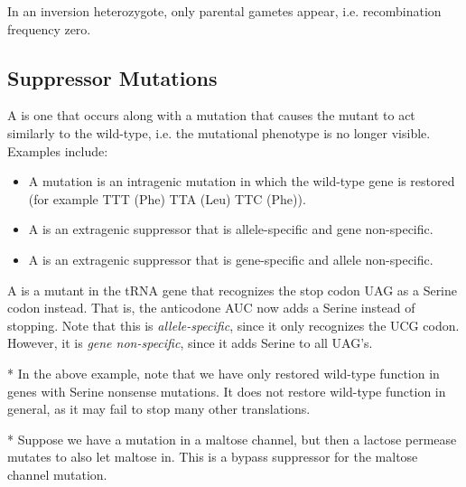 \begin{fact}
	In an inversion heterozygote, only parental gametes appear, i.e. recombination frequency zero.
\end{fact}

\subsection{Suppressor Mutations}

\begin{defn}
	A  is one that occurs along with a mutation that causes the mutant to act similarly to the wild-type, i.e. the mutational phenotype is no longer visible. Examples include:
	\begin{itemize}
		\item A  mutation is an intragenic mutation in which the wild-type gene is restored (for example TTT (Phe) \to TTA (Leu) \to TTC (Phe)).
		\item A  is an extragenic suppressor that is allele-specific and gene non-specific.
		\item A  is an extragenic suppressor that is gene-specific and allele non-specific. 
	\end{itemize}
\end{defn}

\begin{exm}
	A  is a mutant in the tRNA gene that recognizes the stop codon UAG as a Serine codon instead. That is, the anticodone AUC now adds a Serine instead of stopping. Note that this is \emph{allele-specific}, since it only recognizes the UCG codon. However, it is \emph{gene non-specific}, since it adds Serine to all UAG's. 
\end{exm}

\begin{fact}*
	In the above example, note that we have only restored wild-type function in genes with Serine \to nonsense mutations. It does not restore wild-type function in general, as it may fail to stop many other translations.
\end{fact}

\begin{exm}*
	Suppose we have a mutation in a maltose channel, but then a lactose permease mutates to also let maltose in. This is a bypass suppressor for the maltose channel mutation.
\end{exm}
